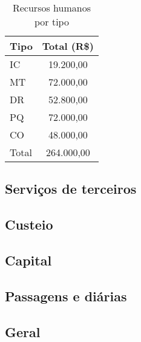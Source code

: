 \begin{table}[!h]
\centering
	\caption{Recursos humanos por tipo}
\begin{tabular}{ lc}
\toprule
   Tipo  & Total (R\$) \\
\midrule
   IC    &   19.200,00 \\
   MT    &   72.000,00 \\
   DR    &   52.800,00 \\
   PQ    &   72.000,00 \\
   CO    &   48.000,00 \\
\midrule
   Total     &   264.000,00 \\
\bottomrule
\end{tabular}
	\label{tab:rhtipo}
\end{table}
 
\subsection{Serviços de terceiros}

\subsection{Custeio}

\subsection{Capital}

\subsection{Passagens e diárias}

\subsection{Geral}
